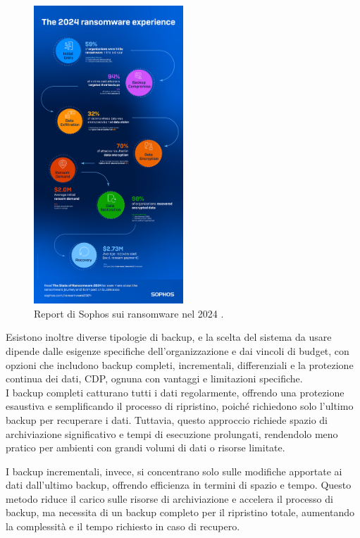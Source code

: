         \begin{figure}[H]
                \centering
                \includegraphics[width=0.5\textwidth]{Immagini/backup_and_d_r_statistics_2.png}
                \caption{Report di Sophos sui ransomware nel 2024 \cite{sophos_rep_b_d_r_ransomware}.}
                \label{fig:ransomware_rep}
            \end{figure}
        
        Esistono inoltre diverse tipologie di backup, e la scelta del sistema da usare dipende dalle esigenze specifiche dell'organizzazione e dai vincoli di budget, con opzioni che includono backup completi, incrementali, differenziali e la protezione continua dei dati, CDP, ognuna con vantaggi e limitazioni specifiche.\\ 
        I backup completi catturano tutti i dati regolarmente, offrendo una protezione esaustiva e semplificando il processo di ripristino, poiché richiedono solo l'ultimo backup per recuperare i dati. Tuttavia, questo approccio richiede spazio di archiviazione significativo e tempi di esecuzione prolungati, rendendolo meno pratico per ambienti con grandi volumi di dati o risorse limitate.

        I backup incrementali, invece, si concentrano solo sulle modifiche apportate ai dati dall'ultimo backup, offrendo efficienza in termini di spazio e tempo. Questo metodo riduce il carico sulle risorse di archiviazione e accelera il processo di backup, ma necessita di un backup completo per il ripristino totale, aumentando la complessità e il tempo richiesto in caso di recupero.
        
